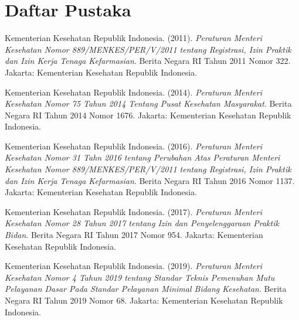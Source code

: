 %
%

\chapter*{Daftar Pustaka}
%
%
%
%


    \indent\indent Kementerian Kesehatan Republik Indonesia. (2011). \emph{Peraturan Menteri Kesehatan Nomor 889/MENKES/PER/V/2011 tentang Registrasi, Izin Praktik dan Izin Kerja Tenaga Kefarmasian}. Berita Negara RI Tahun 2011 Nomor 322. Jakarta: Kementerian Kesehatan Republik Indonesia.
    
    Kementerian Kesehatan Republik Indonesia. (2014). \emph{Peraturan Menteri Kesehatan Nomor 75 Tahun 2014 Tentang Pusat Kesehatan Masyarakat}. Berita Negara RI Tahun 2014 Nomor 1676. Jakarta: Kementerian Kesehatan Republik Indonesia.
    
    Kementerian Kesehatan Republik Indonesia. (2016). \emph{Peraturan Menteri Kesehatan Nomor 31 Tahn 2016 tentang Perubahan Atas Peraturan Menteri Kesehatan Nomor 889/MENKES/PER/V/2011 tentang Registrasi, Izin Praktik dan Izin Kerja Tenaga Kefarmasian}. Berita Negara RI Tahun 2016 Nomor 1137. Jakarta: Kementerian Kesehatan Republik Indonesia.

    Kementerian Kesehatan Republik Indonesia. (2017). \emph{Peraturan Menteri Kesehatan Nomor 28 Tahun 2017 tentang Izin dan Penyelenggaraan Praktik Bidan}. Berita Negara RI Tahun 2017 Nomor 954. Jakarta: Kementerian Kesehatan Republik Indonesia.
    
    Kementerian Kesehatan Republik Indonesia. (2019). \emph{Peraturan Menteri Kesehatan Nomor 4 Tahun 2019 tentang Standar Teknis Pemenuhan Mutu Pelayanan Dasar Pada Standar Pelayanan Minimal Bidang Kesehatan}. Berita Negara RI Tahun 2019 Nomor 68. Jakarta: Kementerian Kesehatan Republik Indonesia.

